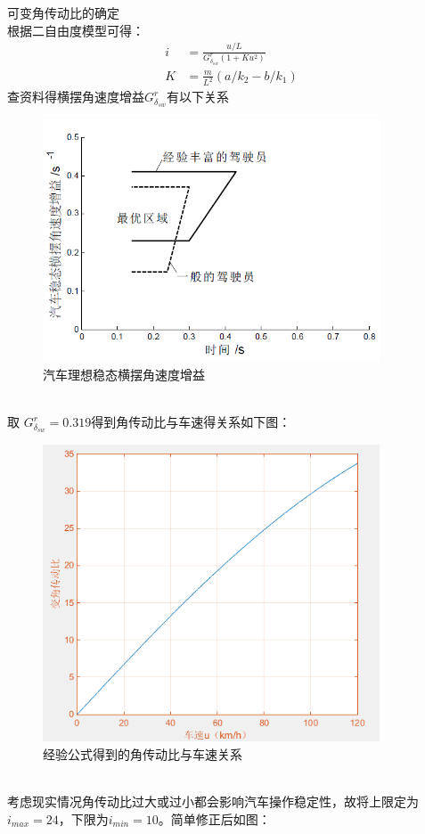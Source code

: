 \documentclass[a4paper,12pt,UTF8]{ctexart}
\begin{document}
\indent 可变角传动比的确定\\
\indent 根据二自由度模型可得：
\begin{align}
  i&=\frac{u/L}{G^r_{\delta_{sw}}(1+Ku^2)}\\
  K&=\frac{m}{L^2}(a/k_2-b/k_1)
\end{align}
\indent 查资料得横摆角速度增益$G^r_{\delta_{sw}}$有以下关系\\
\begin{figure}[htbp]
  \centering
  \includegraphics[width=10cm]{5.png}
  \caption{汽车理想稳态横摆角速度增益}
\end{figure}\\
\indent 取 $G^r_{\delta_{sw}}=0.319$得到角传动比与车速得关系如下图：\\
\begin{figure}[htbp]
  \centering
  \includegraphics[width=10cm]{6.png}
  \caption{经验公式得到的角传动比与车速关系}
\end{figure}\\
\indent 考虑现实情况角传动比过大或过小都会影响汽车操作稳定性，故将上限定为$i_{max}=24$，下限为$i_{min}=10$。简单修正后如图：\\
\end{document}
